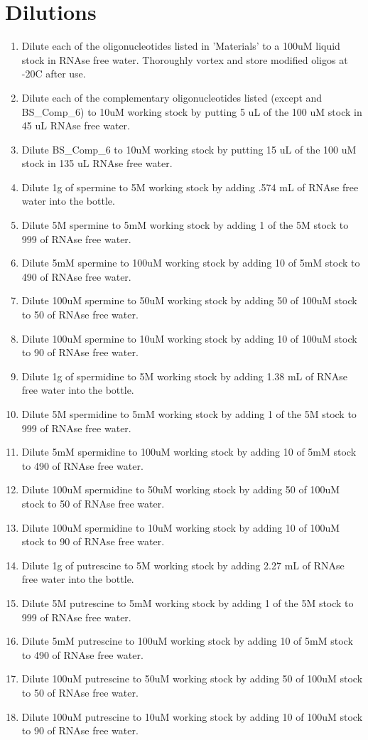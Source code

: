 \documentclass{ssiBio}
\begin{document}
\section{Dilutions}
\begin{enumerate}
\item{Dilute each of the oligonucleotides listed in 'Materials' to a 100uM liquid stock in RNAse free water. Thoroughly vortex and store modified oligos at -20C after use.}
\item{Dilute each of the complementary oligonucleotides listed (except and BS\_Comp\_6) to 10uM working stock by putting 5 uL of the 100 uM stock in 45 uL RNAse free water.}
\item{Dilute BS\_Comp\_6 to 10uM working stock by putting 15 uL of the 100 uM stock in 135 uL RNAse free water.}

\item{Dilute 1g of spermine to 5M working stock by adding .574 mL of RNAse free water into the bottle.}
\item{Dilute 5M spermine to 5mM working stock by adding 1\uL{} of the 5M stock to 999\uL{} of RNAse free water.}
\item{Dilute 5mM spermine to 100uM working stock by adding 10 \uL{} of 5mM stock to 490\uL{} of RNAse free water.}
\item{Dilute 100uM spermine to 50uM working stock by adding 50 \uL{} of 100uM stock to 50\uL{} of RNAse free water.}
\item{Dilute 100uM spermine to 10uM working stock by adding 10 \uL{} of 100uM stock to 90\uL{} of RNAse free water.}

\item{Dilute 1g of spermidine to 5M working stock by adding 1.38 mL of RNAse free water into the bottle.}
\item{Dilute 5M spermidine to 5mM working stock by adding 1\uL{} of the 5M stock to 999\uL{} of RNAse free water.}
\item{Dilute 5mM spermidine to 100uM working stock by adding 10 \uL{} of 5mM stock to 490\uL{} of RNAse free water.}
\item{Dilute 100uM spermidine to 50uM working stock by adding 50 \uL{} of 100uM stock to 50\uL{} of RNAse free water.}
\item{Dilute 100uM spermidine to 10uM working stock by adding 10 \uL{} of 100uM stock to 90\uL{} of RNAse free water.}

\item{Dilute 1g of putrescine to 5M working stock by adding 2.27 mL of RNAse free water into the bottle.}
\item{Dilute 5M putrescine to 5mM working stock by adding 1\uL{} of the 5M stock to 999\uL{} of RNAse free water.}
\item{Dilute 5mM putrescine to 100uM working stock by adding 10 \uL{} of 5mM stock to 490\uL{} of RNAse free water.}
\item{Dilute 100uM putrescine to 50uM working stock by adding 50 \uL{} of 100uM stock to 50\uL{} of RNAse free water.}
\item{Dilute 100uM putrescine to 10uM working stock by adding 10 \uL{} of 100uM stock to 90\uL{} of RNAse free water.}


\end{enumerate}
\end{document}
